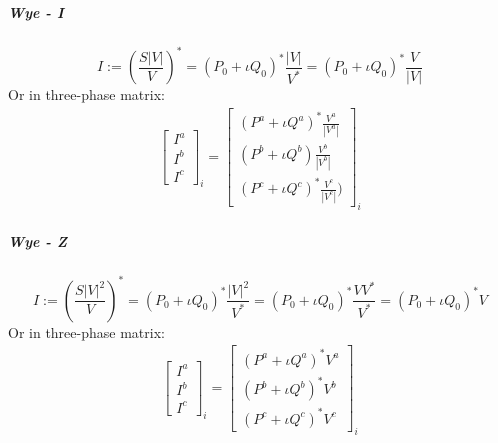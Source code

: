 \documentclass[10pt,journal]{article}
\begin{document}
\subparagraph{Wye - I }
\begin{equation}
    I := (\frac{S|V|}{V})^* = (P_0+\iota Q_0)^*\frac{|V|}{V^*} = (P_0+\iota Q_0)^*\frac{V}{|V|}
\end{equation}
Or in three-phase matrix: 
\begin{align}
\begin{bmatrix}
    I^a\\
    I^b\\
    I^c
    \end{bmatrix}_i = \begin{bmatrix}
    ({ P^a +\iota Q^a})^*\frac{V^a}{|V^a|}\\
    ({ P^b +\iota Q^b})\frac{V^b}{|V^b|}\\
    ({ P^c +\iota Q^c})^*\frac{V^c}{|V^c|})
    \end{bmatrix}_i 
    \end{align}
    
\subparagraph{Wye - Z }
\begin{equation}
    I := (\frac{S|V|^2}{V})^* = ({P_0+\iota Q_0})^*\frac{|V|^2}{V^*} = ({P_0+\iota Q_0})^*\frac{VV^*}{V^*} =  ({P_0+\iota Q_0})^*V
\end{equation}
Or in three-phase matrix: 
\begin{align}
\begin{bmatrix}
    I^a\\
    I^b\\
    I^c
    \end{bmatrix}_i = \begin{bmatrix}
   ({ P^a +\iota Q^a})^*{V^a}\\
    ({ P^b +\iota Q^b})^*{V^b}\\
    ({ P^c +\iota Q^c})^*{V^c}
    \end{bmatrix}_i 
    \end{align}
\end{document}
